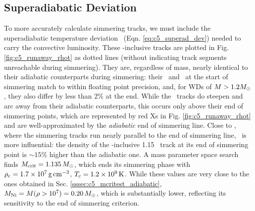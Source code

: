 

\subsection{Superadiabatic Deviation \dnabconv}
\label{ssec:c5_runaway_superad}

To more accurately calculate simmering tracks, we must include the superadiabatic temperature deviation \dnabconv\ (Eqn. \ref{eq:c5_superad_dev}) needed to carry the convective luminosity.  These \dnabconv-inclusive tracks are plotted in Fig. \ref{fig:c5_runaway_rhot} as dotted lines (without indicating track segments unreachable during simmering).  They are, regardless of mass, nearly identical to their adiabatic counterparts during simmering: their \rhoc\ and \Tc\ at the start of simmering match to within floating point precision, and, for WDs of $M > 1.2\Msun$, they also differ by less than 2\% at the end.  While the \dnabconv\ tracks do steepen and arc away from their adiabatic counterparts, this occurs only above their end of simmering points, which are represented by red Xs in Fig. \ref{fig:c5_runaway_rhot} and are well-approximated by the \textit{adiabatic} end of simmering line.  Close to \Mcrit, where the simmering tracks run nearly parallel to the end of simmering line, \dnabconv\ is more influential: the density of the \dnabconv-inclusive 1.15 \Msun\ track at its end of simmering point is $\sim15$\% higher than the adiabatic one.  A mass parameter space search finds $\Mcrit=1.135\,\Msun$, which ends its simmering phase with $\rhoc = 1.7\times10^7\,\gcc$, $\Tc = 1.2\times10^9\,\mrm{K}$.  While these values are very close to the ones obtained in Sec. \ref{sssec:c5_mcritest_adiabatic}, $\MNi = M(\rho>10^7) = 0.20\,\Msun$, which is substantially lower, reflecting its sensitivity to the end of simmering criterion.


